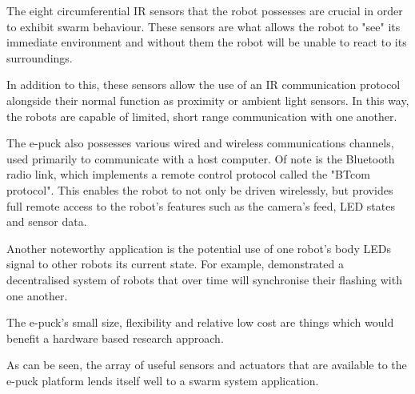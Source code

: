 \clearpage


The eight circumferential IR sensors that the robot possesses are crucial in order to exhibit swarm behaviour. These sensors are what allows the robot to "see" its immediate environment and without them the robot will be unable to react to its surroundings.

In addition to this, these sensors allow the use of an IR communication protocol alongside their normal function as proximity or ambient light sensors. In this way, the robots are capable of limited, short range communication with one another.

The e-puck also possesses various wired and wireless communications channels, used primarily to communicate with a host computer. Of note is the Bluetooth radio link, which implements a remote control protocol called the "BTcom protocol". This enables the robot to not only be driven wirelessly, but provides full remote access to the robot's features such as the camera's feed, LED states and sensor data. \cite{epfl-epuck}

Another noteworthy application is the potential use of one robot's body LEDs  signal to other robots its current state. For example, \citeauthor{Christensen:2009:FFS:1650386.1650393} demonstrated a decentralised system of robots that over time will synchronise their flashing with one another. \cite{Christensen:2009:FFS:1650386.1650393}

The e-puck's small size, flexibility and relative low cost are things which would benefit a hardware based research approach.

As can be seen, the array of useful sensors and actuators that are available to the e-puck platform lends itself well to a swarm system application. 

